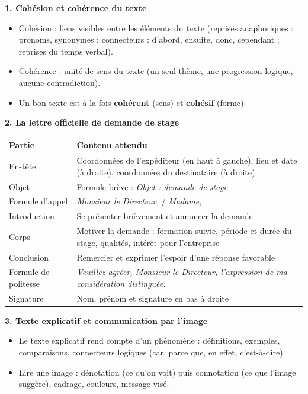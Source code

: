 \documentclass[11pt]{article}
\newcommand{\cle}[1]{{\popxbold\color{popdark}#1}}
\begin{document}
\begin{bilan}
\textbf{1. Cohésion et cohérence du texte}
\begin{itemize}
  \item \cle{Cohésion} : liens visibles entre les éléments du texte (reprises anaphoriques : pronoms, synonymes ; connecteurs : d'abord, ensuite, donc, cependant ; reprises du temps verbal).
  \item \cle{Cohérence} : unité de sens du texte (un seul thème, une progression logique, aucune contradiction).
  \item Un bon texte est à la fois \textbf{cohérent} (sens) et \textbf{cohésif} (forme).
\end{itemize}

\textbf{2. La lettre officielle de demande de stage}
\begin{center}
\begin{tabularx}{\linewidth}{|l|X|}\hline
\rowcolor{popblueL} \textbf{Partie} & \textbf{Contenu attendu} \\ \hline
En-tête & Coordonnées de l'expéditeur (en haut à gauche), lieu et date (à droite), coordonnées du destinataire (à droite) \\ \hline
Objet & Formule brève : \emph{Objet : demande de stage} \\ \hline
Formule d'appel & \emph{Monsieur le Directeur,} / \emph{Madame,} \\ \hline
Introduction & Se présenter brièvement et annoncer la demande \\ \hline
Corps & Motiver la demande : formation suivie, période et durée du stage, qualités, intérêt pour l'entreprise \\ \hline
Conclusion & Remercier et exprimer l'espoir d'une réponse favorable \\ \hline
Formule de politesse & \emph{Veuillez agréer, Monsieur le Directeur, l'expression de ma considération distinguée.} \\ \hline
Signature & Nom, prénom et signature en bas à droite \\ \hline
\end{tabularx}
\end{center}

\textbf{3. Texte explicatif et communication par l'image}
\begin{itemize}
  \item Le \cle{texte explicatif} rend compte d'un phénomène : définitions, exemples, comparaisons, connecteurs logiques (car, parce que, en effet, c'est-à-dire).
  \item Lire une image : \cle{dénotation} (ce qu'on voit) puis \cle{connotation} (ce que l'image suggère), cadrage, couleurs, message visé.
\end{itemize}


\end{bilan}
\end{document}
